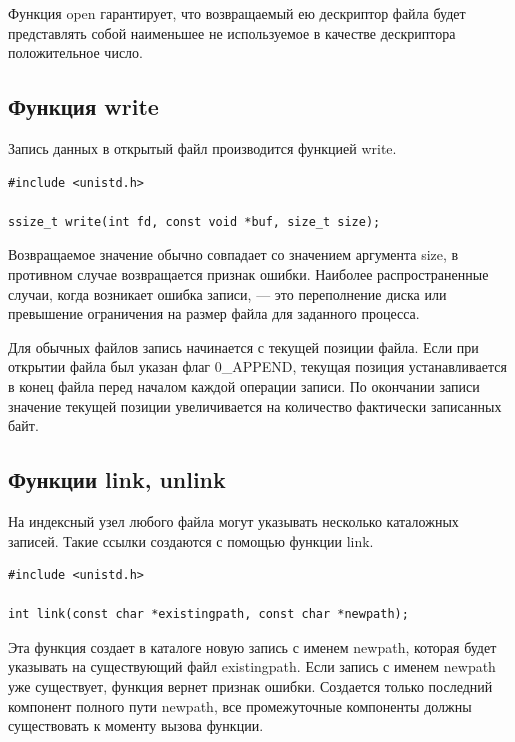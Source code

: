 Функция open гарантирует, что возвращаемый ею дескриптор файла будет представлять собой наименьшее не используемое в качестве дескриптора положительное число.



\subsection{Функция write}

Запись данных в открытый файл производится функцией write.

\begin{lstlisting}[label=code:write,caption=Функция write]
#include <unistd.h>
	
ssize_t write(int fd, const void *buf, size_t size);
\end{lstlisting}

Возвращаемое значение обычно совпадает со значением аргумента size, в противном случае возвращается признак ошибки. Наиболее распространенные случаи, когда возникает ошибка записи, --- это переполнение диска или превышение ограничения на размер файла для заданного процесса.

Для обычных файлов запись начинается с текущей позиции файла. Если при открытии файла был указан флаг 0\_APPEND, текущая позиция устанавливается в конец файла перед началом каждой операции записи. По окончании записи значение текущей позиции увеличивается на количество фактически записанных байт.


\subsection{Функции link, unlink}

На индексный узел любого файла могут указывать несколько каталожных записей. Такие ссылки создаются с помощью функции link.

\begin{lstlisting}[label=code:link,caption=Функция link]
#include <unistd.h>

int link(const char *existingpath, const char *newpath);
\end{lstlisting}

Эта функция создает в каталоге новую запись с именем newpath, которая будет указывать на существующий файл existingpath. Если запись с именем newpath уже существует, функция вернет признак ошибки. Создается только последний компонент полного пути newpath, все промежуточные компоненты должны существовать к моменту вызова функции.

